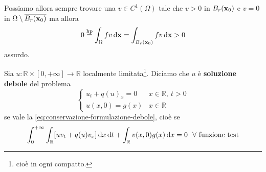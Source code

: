 \begin{dimostrazione}
\begin{figure}[H]
    \end{figure}
    \FloatBarrier

    Possiamo allora sempre trovare una $v\in C^{1}(\Omega)$ tale che $v>0$ in $B_{r}(\mathbf{x}_{0})$ e $v=0$ in $\Omega \setminus \overline{B_{r}(\mathbf{x}_{0})}$ ma allora
    \begin{equation*}
        0 \overset{\text{hp}}{=} \int _{\Omega } fv\,\mathrm d \mathbf{x}=\int _{B_{r}(\mathbf{x}_{0})} fv\,\mathrm d \mathbf{x} >0
    \end{equation*}
    assurdo.
\end{dimostrazione}
\begin{definition}
     Sia $u:\mathbb{R} \times [ 0,+\infty ]\rightarrow \mathbb{R}$ localmente limitata\footnote{cioè in ogni compatto.}. Diciamo che $u$ è \textbf{soluzione debole} del problema
    \begin{equation*}
        \begin{cases}
            u_{t} +q(u)_{x} =0 & x\in \mathbb{R} ,\ t >0 \\
            u(x,0) =g(x)       & x\in \mathbb{R}
        \end{cases}
    \end{equation*}
    se vale la \eqref{eq:conservazione-formulazione-debole}, cioè se
    \begin{equation*}
        \int ^{+\infty }_{0}\int _{\mathbb{R}}[ uv_{t} +q(u) v_{x}] \,\mathrm d x\,\mathrm d t+\int _{\mathbb{R}} v(x,0) g(x) \,\mathrm d x=0\ \ \forall \ \text{funzione test}
    \end{equation*}
\end{definition}
